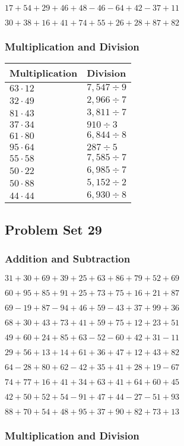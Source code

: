 \(17+54+29+46+48-46-64+42-37+11\)

\(30+38+16+41+74+55+26+28+87+82\)

\hypertarget{multiplication-and-division-68}{%
\subsubsection{Multiplication and
Division}\label{multiplication-and-division-68}}

\begin{longtable}[]{@{}ll@{}}
\toprule
Multiplication & Division\tabularnewline
\midrule
\endhead
\(63\cdot12\) & \(7,547÷9\)\tabularnewline
\(32\cdot49\) & \(2,966÷7\)\tabularnewline
\(81\cdot43\) & \(3,811÷7\)\tabularnewline
\(37\cdot34\) & \(910÷3\)\tabularnewline
\(61\cdot80\) & \(6,844÷8\)\tabularnewline
\(95\cdot64\) & \(287÷5\)\tabularnewline
\(55\cdot58\) & \(7,585÷7\)\tabularnewline
\(50\cdot22\) & \(6,985÷7\)\tabularnewline
\(50\cdot88\) & \(5,152÷2\)\tabularnewline
\(44\cdot44\) & \(6,930÷8\)\tabularnewline
\bottomrule
\end{longtable}

\hypertarget{problem-set-29-1}{%
\subsection{Problem Set 29}\label{problem-set-29-1}}

\hypertarget{addition-and-subtraction-69}{%
\subsubsection{Addition and
Subtraction}\label{addition-and-subtraction-69}}

\(31+30+69+39+25+63+86+79+52+ 69\)

\(60+95+85+91+25+73+75+16+21+87\)

\(69-19+87-94+46+59-43+37+99+36\)

\(68+30+43+73+41+59+75+12+23+51\)

\(49+60+24+85+63-52-60+42+31-11\)

\(29+56+13+14+61+36+47+12+43+82\)

\(64-28+80+62-42+35+41+28+19-67\)

\(74+77+16+41+34+63+41+64+60+45\)

\(42+50+52+54-91+47+44-27-51+93\)

\(88+70+54+48+95+37+90+82+73+13\)

\hypertarget{multiplication-and-division-69}{%
\subsubsection{Multiplication and
Division}\label{multiplication-and-division-69}}

